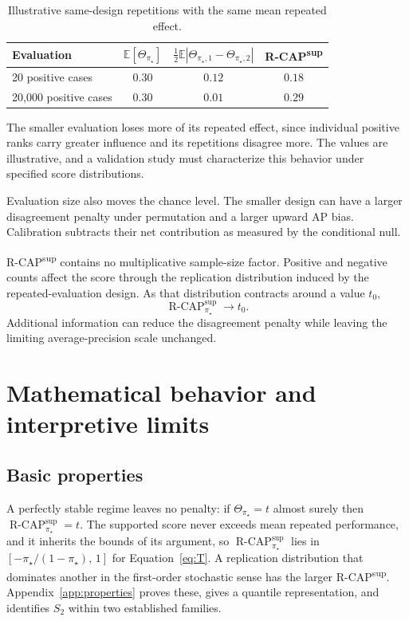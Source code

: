 \documentclass[11pt]{article}
\newcommand{\E}{\mathbb{E}}
\newcommand{\RCAP}{\operatorname{R\text{-}CAP}^{\mathrm{sup}}_{\pi_\star}}
\theoremstyle{remark}
\begin{document}
\begin{table}[ht]
\centering
\caption{Illustrative same-design repetitions with the same mean repeated effect.}
\label{tab:illustration}
\begin{tabular}{@{}lccc@{}}
\toprule
Evaluation & $\E[\Theta_{\pi_\star}]$ & $\tfrac12\E|\Theta_{\pi_\star,1}-\Theta_{\pi_\star,2}|$ & R-CAP\textsuperscript{sup} \\
\midrule
20 positive cases & $0.30$ & $0.12$ & $0.18$ \\
20,000 positive cases & $0.30$ & $0.01$ & $0.29$ \\
\bottomrule
\end{tabular}
\end{table}

The smaller evaluation loses more of its repeated effect, since individual positive ranks carry greater influence and its repetitions disagree more. The values are illustrative, and a validation study must characterize this behavior under specified score distributions.

Evaluation size also moves the chance level. The smaller design can have a larger disagreement penalty under permutation and a larger upward AP bias. Calibration subtracts their net contribution as measured by the conditional null.

R-CAP\textsuperscript{sup} contains no multiplicative sample-size factor. Positive and negative counts affect the score through the replication distribution induced by the repeated-evaluation design. As that distribution contracts around a value $t_0$,
\[
\RCAP\longrightarrow t_0.
\]
Additional information can reduce the disagreement penalty while leaving the limiting average-precision scale unchanged.

\section{Mathematical behavior and interpretive limits}
\label{sec:properties}

\subsection{Basic properties}

A perfectly stable regime leaves no penalty: if $\Theta_{\pi_\star}=t$ almost surely then $\RCAP=t$. The supported score never exceeds mean repeated performance, and it inherits the bounds of its argument, so $\RCAP$ lies in $[-\pi_\star/(1-\pi_\star),\,1]$ for Equation~\eqref{eq:T}. A replication distribution that dominates another in the first-order stochastic sense has the larger R-CAP\textsuperscript{sup}. Appendix~\ref{app:properties} proves these, gives a quantile representation, and identifies $S_2$ within two established families.
\end{document}
